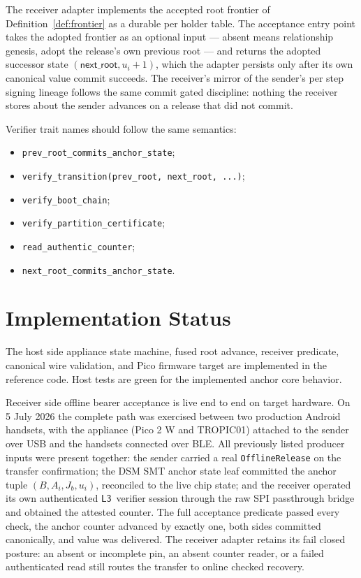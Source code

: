 \documentclass[11pt]{article}
\theoremstyle{definition}
\theoremstyle{remark}
\newcommand{\Lthree}{\ensuremath{\mathsf{L3}}}
\newcommand{\Bundle}{\ensuremath{B}}
\newcommand{\Ahead}{\ensuremath{A}}
\newcommand{\Bhead}{\ensuremath{J}}
\begin{document}
The receiver adapter implements the accepted root frontier of Definition~\ref{def:frontier} as a
durable per holder table. The acceptance entry point takes the adopted frontier as an optional
input --- absent means relationship genesis, adopt the release's own previous root --- and returns
the adopted successor state \((\mathsf{next\_root},u_i+1)\), which the adapter persists only after
its own canonical value commit succeeds. The receiver's mirror of the sender's per step signing
lineage follows the same commit gated discipline: nothing the receiver stores about the sender
advances on a release that did not commit.

Verifier trait names should follow the same semantics:

\begin{itemize}
\item \texttt{prev\_root\_commits\_anchor\_state};
\item \texttt{verify\_transition(prev\_root, next\_root, ...)};
\item \texttt{verify\_boot\_chain};
\item \texttt{verify\_partition\_certificate};
\item \texttt{read\_authentic\_counter};
\item \texttt{next\_root\_commits\_anchor\_state}.
\end{itemize}

\section{Implementation Status}

The host side appliance state machine, fused root advance, receiver predicate, canonical wire
validation, and Pico firmware target are implemented in the reference code. Host tests are green
for the implemented anchor core behavior.

Receiver side offline bearer acceptance is live end to end on target hardware. On 5 July 2026 the
complete path was exercised between two production Android handsets, with the appliance (Pico 2 W
and TROPIC01) attached to the sender over USB and the handsets connected over BLE. All previously
listed producer inputs were present together: the sender carried a real \texttt{OfflineRelease} on
the transfer confirmation; the DSM SMT anchor state leaf committed the anchor tuple
\((\Bundle,\Ahead_i,\Bhead_b,u_i)\), reconciled to the live chip state; and the receiver operated
its own authenticated \Lthree\ verifier session through the raw SPI passthrough bridge and
obtained the attested counter. The full acceptance predicate passed every check, the anchor
counter advanced by exactly one, both sides committed canonically, and value was delivered. The
receiver adapter retains its fail closed posture: an absent or incomplete pin, an absent counter
reader, or a failed authenticated read still routes the transfer to online checked recovery.
\end{document}
